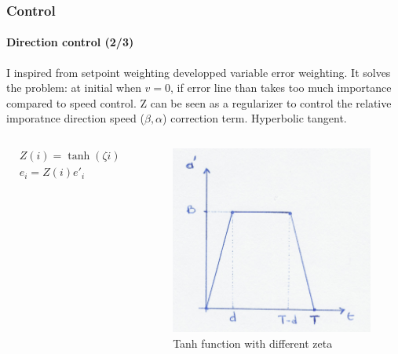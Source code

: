 \documentclass[10pt]{beamer}
\begin{document}
\begin{frame}
\frametitle{Control}
\framesubtitle{Direction control (2/3)}
I inspired from setpoint weighting developped variable error weighting. It solves the problem: at initial when $v=0$, if error line than takes too much importance compared to speed control. Z can be seen as 
a regularizer to control the relative imporatnce direction speed ($\beta, \alpha$) correction term. Hyperbolic tangent.
\begin{columns}[c]

$$
\begin{aligned}
&Z(i) = \tanh(\zeta i)  \\
&e_i = Z(i)e'_i
\end{aligned}
$$

\begin{figure}[hbtp]
\centering
\label{fig:smooth-acc}
\includegraphics[scale=0.07]{figures/smooth-acc}
\caption{Tanh function with different zeta}
\end{figure}
\end{columns}
\end{frame}

\end{document}
